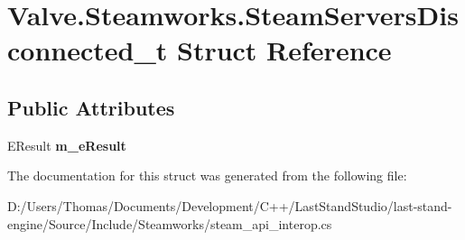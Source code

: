 \hypertarget{structValve_1_1Steamworks_1_1SteamServersDisconnected__t}{}\section{Valve.\+Steamworks.\+Steam\+Servers\+Disconnected\+\_\+t Struct Reference}
\label{structValve_1_1Steamworks_1_1SteamServersDisconnected__t}
\subsection*{Public Attributes}
\begin{DoxyCompactItemize}
\item 
\hypertarget{structValve_1_1Steamworks_1_1SteamServersDisconnected__t_ab2b1b3b3bf66f3ead83dfd6962c1216e}{}E\+Result {\bfseries m\+\_\+e\+Result}\label{structValve_1_1Steamworks_1_1SteamServersDisconnected__t_ab2b1b3b3bf66f3ead83dfd6962c1216e}

\end{DoxyCompactItemize}


The documentation for this struct was generated from the following file\+:\begin{DoxyCompactItemize}
\item 
D\+:/\+Users/\+Thomas/\+Documents/\+Development/\+C++/\+Last\+Stand\+Studio/last-\/stand-\/engine/\+Source/\+Include/\+Steamworks/steam\+\_\+api\+\_\+interop.\+cs\end{DoxyCompactItemize}
